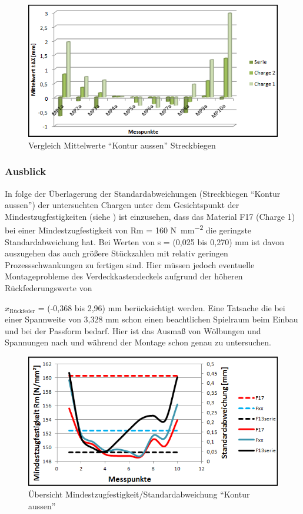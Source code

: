 \documentclass[12pt,a4paper,parskip]{scrartcl}
\begin{document}
{\begin{figure}[!htb] 
\centering
\includegraphics[width=1\linewidth,height=.3\textheight]{mitkontausstrckb}
\caption{Vergleich Mittelwerte "`Kontur aussen"' Streckbiegen}
\label{fig:mitstrckb}
\end{figure}

\newpage

\subsubsection{Ausblick}
In folge der Überlagerung der Standardabweichungen (Streckbiegen "`Kontur aussen"') der untersuchten Chargen unter dem Gesichtspunkt der Mindestzugfestigkeiten (siehe ) ist einzusehen, dass das Material F17 (Charge 1) bei einer Mindestzugfestigkeit von Rm = 160  \si{\newton\per\milli\meter\squared}  die geringste Standardabweichung hat. Bei Werten von s = (0,025  bis 0,270) \si{\milli\meter}  ist davon auszugehen das auch größere Stückzahlen mit relativ geringen Prozessschwankungen zu fertigen sind. Hier müssen jedoch eventuelle Montageprobleme des Verdeckkastendeckels aufgrund der höheren Rückfederungswerte von {$x_{\text{Rückfeder}}$ = (-0,368  bis 2,96) \si{\milli\meter} berücksichtigt werden. Eine Tatsache die bei einer Spannweite von 3,328 \si{\milli\meter} schon einen beachtlichen Spielraum beim Einbau und bei der Passform bedarf.  %
Hier ist das Ausmaß von Wölbungen und Spannungen nach und während der Montage schon genau zu untersuchen.

\begin{figure}[!h]
\centering
\includegraphics[width=1\linewidth,height=.3\textheight]{standzugrel}
\caption{Übersicht Mindestzugfestigkeit/Standardabweichung "`Kontur aussen"'}
\label{fig:standzugrel}
\end{figure} 

}}
\end{document}

